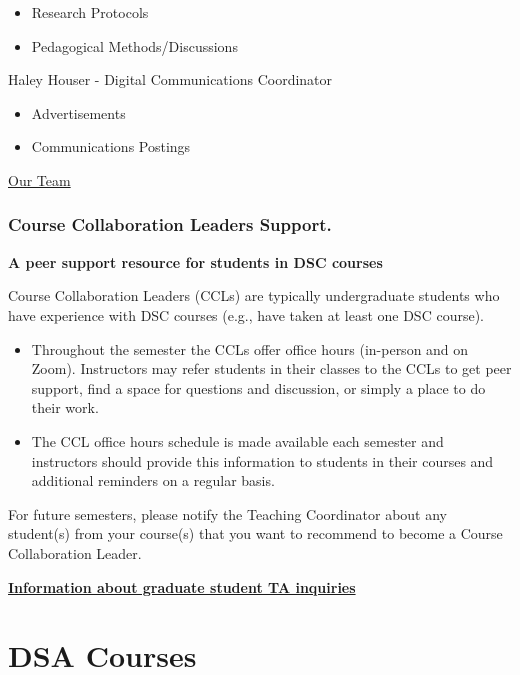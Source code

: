 \documentclass[
]{book}
\providecommand{\tightlist}{%
  \setlength{\itemsep}{0pt}\setlength{\parskip}{0pt}}
\begin{document}
\begin{itemize}
\tightlist
\item
  Research Protocols
\item
  Pedagogical Methods/Discussions
\end{itemize}

Haley Houser - Digital Communications Coordinator

\begin{itemize}
\tightlist
\item
  Advertisements
\item
  Communications Postings
\end{itemize}

\href{https://datascienceacademy.ncsu.edu/about/our-team/}{Our Team}

\hypertarget{course-collaboration-leaders-support.}{%
\subsection{Course Collaboration Leaders Support.}\label{course-collaboration-leaders-support.}}

\textbf{A peer support resource for students in DSC courses}

Course Collaboration Leaders (CCLs) are typically undergraduate students who have experience with DSC courses (e.g., have taken at least one DSC course).

\begin{itemize}
\tightlist
\item
  Throughout the semester the CCLs offer office hours (in-person and on Zoom). Instructors may refer students in their classes to the CCLs to get peer support, find a space for questions and discussion, or simply a place to do their work.
\item
  The CCL office hours schedule is made available each semester and instructors should provide this information to students in their courses and additional reminders on a regular basis.
\end{itemize}

For future semesters, please notify the Teaching Coordinator about any student(s) from your course(s) that you want to recommend to become a Course Collaboration Leader.

\href{https://docs.google.com/document/d/1VPfx_Ib2ToiO3eP1ipACCrsnoFTWcJNVhCXyESGf5PY/edit?usp=sharing}{\textbf{Information about graduate student TA inquiries}}

\hypertarget{dsa-courses}{%
\chapter{DSA Courses}\label{dsa-courses}}
\end{document}
